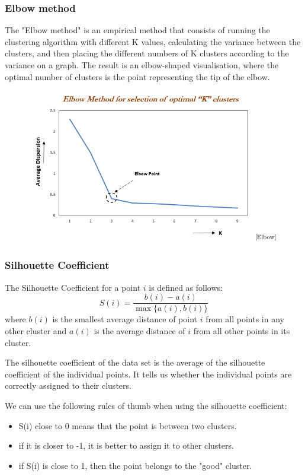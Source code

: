 \documentclass[12pt,a4paper,openany,UKenglish]{scrreprt}
\newcommand{\bib}[1]{$^\text{\cite{#1}}$}
\begin{document}
\subsubsection{Elbow method}
The "Elbow method" is an empirical method that consists of running the clustering algorithm with different K values, calculating the variance between the clusters, and then placing the different numbers of K clusters according to the variance on a graph. The result is an elbow-shaped visualisation, where the optimal number of clusters is the point representing the tip of the elbow.

\begin{figure}[H]
	\centering
	\includegraphics[width=0.9\textwidth]{../Images/Elbow_Method.png}\bib{Elbow}
\end{figure}

\subsubsection{Silhouette Coefficient}
The Silhouette Coefficient for a point $i$ is defined as follows:
$$
	S(i) = \frac{b(i)-a(i)}{\max\{a(i), b(i)\}}
$$
where $b(i)$ is the smallest average distance of point $i$ from all points in any other cluster and $a(i)$ is the average distance of $i$ from all other points in its cluster.

The silhouette coefficient of the data set is the average of the silhouette coefficient of the individual points. It tells us whether the individual points are correctly assigned to their clusters.

We can use the following rules of thumb when using the silhouette coefficient:
\begin{itemize}
	\item S(i) close to 0 means that the point is between two clusters.
	\item if it is closer to -1, it is better to assign it to other clusters.
	\item if S(i) is close to 1, then the point belongs to the "good" cluster.
\end{itemize}
\end{document}

